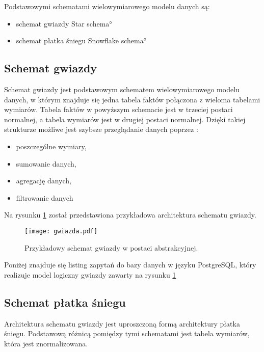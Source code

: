 Podstawowymi schematami wielowymiarowego modelu danych są:
\begin{itemize}
 \item schemat gwiazdy \ang{Star schema} 
 \item schemat płatka śniegu \ang{Snowflake schema}
\end{itemize}

\subsection{Schemat gwiazdy}
Schemat gwiazdy jest podstawowym schematem wielowymiarowego modelu danych,
 w którym znajduje się jedna tabela faktów połączona z wieloma tabelami wymiarów.
Tabela faktów w powyższym schemacie jest w trzeciej postaci normalnej, a tabela wymiarów jest w drugiej postaci normalnej.
Dzięki takiej strukturze możliwe jest szybsze przeglądanie danych poprzez \cite{TodMan, link_hd}:
\begin{itemize}
 \item poszczególne wymiary,
 \item sumowanie danych,
 \item agregację danych,
 \item filtrowanie danych
\end{itemize}

Na rysunku  \ref{fig:gwiazda} został przedstawiona przykładowa architektura schematu gwiazdy.
\begin{center}
\begin{figure}[H]
  \begin{center}
    \texttt{[image: gwiazda.pdf]}
  \end{center}
  \caption{Przykładowy schemat gwiazdy w postaci abstrakcyjnej. }
    \label{fig:gwiazda}
\end{figure}
\end{center}
Poniżej znajduje się listing zapytań do bazy danych w języku PostgreSQL,
 który realizuje model logiczny gwiazdy zawarty na rysunku \ref{fig:gwiazda}


\subsection{Schemat płatka śniegu}
Architektura schematu gwiazdy jest uproszczoną formą architektury płatka śniegu.
Podstawową różnicą pomiędzy tymi schematami jest tabela wymiarów, która jest znormalizowana.

